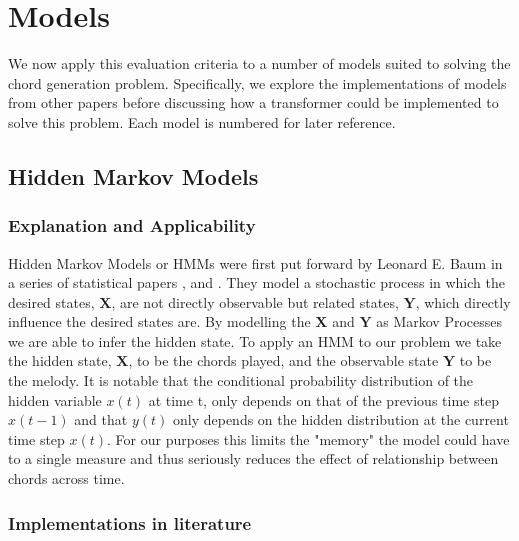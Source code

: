 \section{Models}

We now apply this evaluation criteria to a number of models suited to solving the chord generation problem. 
Specifically, we explore the implementations of models from other papers before discussing how a transformer could be implemented to solve this problem.
Each model is numbered for later reference.

\subsection{Hidden Markov Models}
\label{subsec:HMM}
\subsubsection{Explanation and Applicability}
Hidden Markov Models or HMMs were first put forward by Leonard E. Baum in a series of statistical papers ,  and . 
They model a stochastic process in which the desired states, $\boldsymbol{X}$, are not directly observable but related states, $\boldsymbol{Y}$, which directly influence the desired states are. 
By modelling the $\boldsymbol{X}$ and $\boldsymbol{Y}$ as Markov Processes 
we are able to infer the hidden state.
To apply an HMM to our problem we take the hidden state, $\boldsymbol{X}$, to be the chords played, and the observable state $\boldsymbol{Y}$ to be the melody.
It is notable that the conditional probability distribution of the hidden variable $x(t)$ at time t, only depends on that of the previous time step $x(t-1)$ and that $y(t)$ only depends on the hidden distribution at the current time step $x(t)$.
For our purposes this limits the "memory" the model could have to a single measure and thus seriously reduces the effect of relationship between chords across time.

\subsubsection{Implementations in literature}

